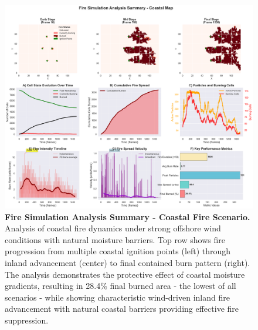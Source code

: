 \begin{figure}[H]
	\centering
	\includegraphics[width=\textwidth]{media/report_summary_coast.png}
	\caption{
		\textbf{Fire Simulation Analysis Summary - Coastal Fire Scenario.}
		Analysis of coastal fire dynamics under strong offshore wind conditions with natural moisture barriers. Top row shows fire progression from multiple coastal ignition points (left) through inland advancement (center) to final contained burn pattern (right). The analysis demonstrates the protective effect of coastal moisture gradients, resulting in 28.4\% final burned area - the lowest of all scenarios - while showing characteristic wind-driven inland fire advancement with natural coastal barriers providing effective fire suppression.
	}
	\label{fig:res_coast}
\end{figure}
